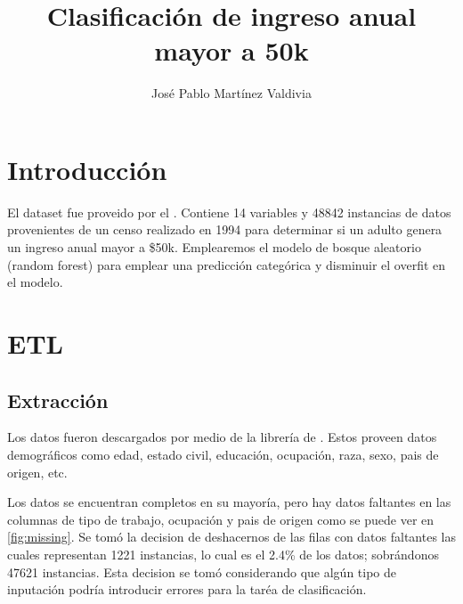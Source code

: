 \documentclass[twocolumn]{article}
\title{Clasificación de ingreso anual mayor a 50k}
\author{José Pablo Martínez Valdivia}
\begin{document}


\section{Introducción}
El dataset  fue proveido por el .
Contiene 14 variables y 48842 instancias de datos provenientes de un censo realizado
en 1994 para determinar si un adulto genera un ingreso anual mayor a \$50k.
Emplearemos el modelo de bosque aleatorio (random forest) para emplear una predicción 
categórica y disminuir el overfit en el modelo.

\section{ETL}
\subsection{Extracción}
Los datos fueron descargados por medio de la librería de .
Estos proveen datos demográficos como edad, estado civil, educación, ocupación, raza,
sexo, pais de origen, etc.

Los datos se encuentran completos en su mayoría, pero hay datos faltantes en 
las columnas de tipo de trabajo, ocupación y pais de origen como se puede ver en
\ref{fig:missing}. Se tomó la decision de deshacernos de las filas con datos faltantes
las cuales representan 1221 instancias, lo cual es el 2.4\% de los datos; sobrándonos
47621 instancias. Esta decision se tomó considerando que algún tipo de inputación 
podría introducir errores para la taréa de clasificación.
\end{document}
